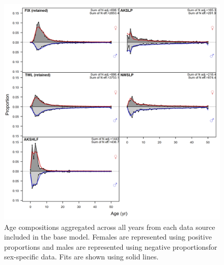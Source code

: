 \documentclass[11pt,
  english,
  a4paper,
]{article}
\begin{document}
\begin{figure}
\centering
\includegraphics[width=1\textwidth,height=1\textheight]{figs/comp_agefit__aggregated_across_time.png}
\caption{Age compositions aggregated across all years from each data source included in the base model. Females are represented using positive proportions and males are represented using negative proportionsfor sex-specific data. Fits are shown using solid lines.\label{fig:acaggregate}}
\end{figure}

\tagmcend\tagstructend

\end{document}
